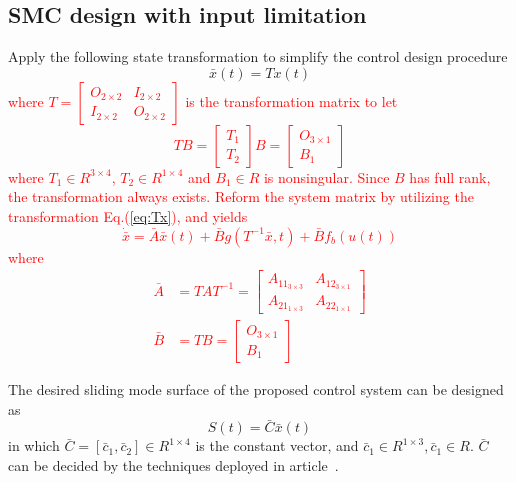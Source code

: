 \documentclass[3p]{elsarticle}
\theoremstyle{plain}
\begin{document}
\subsection{SMC design with input limitation}
Apply the following state transformation to simplify the control design procedure
\begin{equation}
\bar{x}(t) = Tx(t)\label{eq:Tx}
\end{equation}
\textcolor{red}{
where $T=\begin{bmatrix}O_{2\times 2} &I_{2\times 2}\\ I_{2\times 2} &O_{2\times 2}\end{bmatrix}$ is the transformation matrix to let
\begin{equation}
TB =
\begin{bmatrix}
T_1\\T_2
\end{bmatrix}B
=
\begin{bmatrix}
O_{3 \times 1}\\B_1
\end{bmatrix}\label{eq:TB}
\end{equation}
where $T_1 \in R^{3\times 4}$, $T_2 \in R^{1 \times 4}$ and $B_1 \in R$ is nonsingular. Since $B$ has full rank, the transformation always exists. Reform the system matrix by utilizing the transformation Eq.(\ref{eq:Tx}), and yields
\begin{equation}
\dot{\bar{x}} = \bar{A}\bar{x}(t) + \bar{B} g(T^{-1}\bar{x},t) + \bar{B} f_b(u(t)) \label{eq:barABC}
\end{equation}
where
\begin{align*}
\bar{A} &= TAT^{-1}=\begin{bmatrix}
A_{11_{3\times 3}}
&A_{12_{3\times 1}}\\
A_{21_{1\times 3}}
&A_{22_{1\times 1}}\end{bmatrix}\\
\bar{B} &= TB = \begin{bmatrix}O_{3\times 1}\\B_{1}\end{bmatrix}
\end{align*}}\par
The desired sliding mode surface of the proposed control system can be designed as
\begin{equation}
S(t) = \bar{C}\bar{x}(t)\label{eq:S}
\end{equation}
in which $\bar{C} = [\bar{c}_1,\bar{c}_2]\in R^{1\times 4}$ is the constant vector, and $\bar{c}_1\in R^{1\times 3},\bar{c}_1\in R$. $\bar{C}$ can be decided by the techniques deployed in article~\cite{lyshevski2012control}.\par
\end{document}
